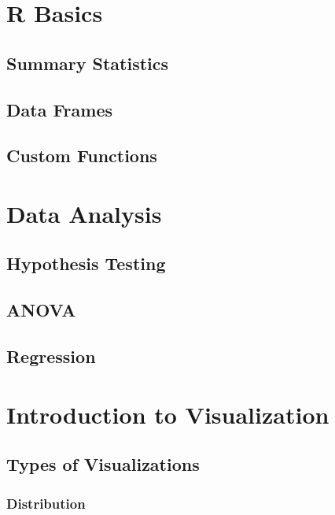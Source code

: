 \documentclass[
  letterpaper,
  DIV=11,
  numbers=noendperiod]{scrreprt}
\begin{document}
\part{R Basics}

\chapter{Summary Statistics}\label{summary-statistics}

\chapter{Data Frames}\label{data-frames}

\chapter{Custom Functions}\label{custom-functions}

\part{Data Analysis}

\chapter{Hypothesis Testing}\label{hypothesis-testing}

\chapter{ANOVA}\label{anova}

\chapter{Regression}\label{regression}

\part{Introduction to Visualization}

\chapter*{Types of Visualizations}\label{types-of-visualizations}


\section*{Distribution}\label{distribution}
\end{document}
